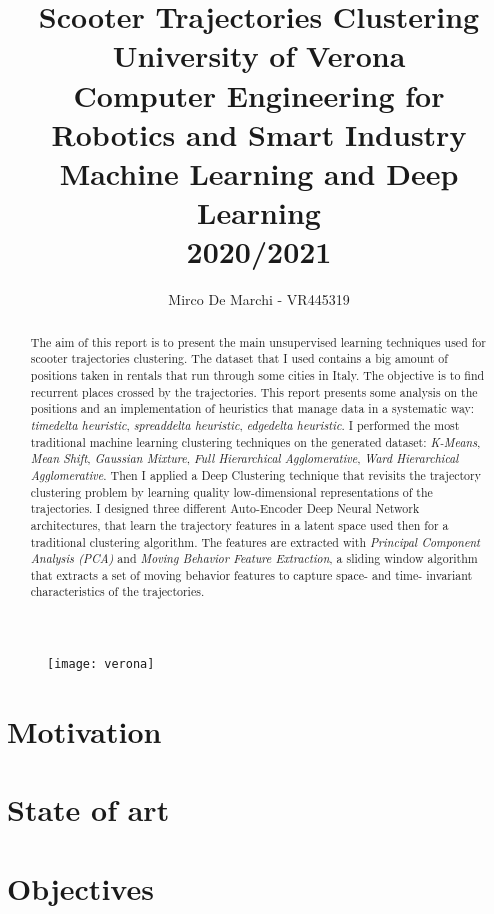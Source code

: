 \documentclass[]{IEEEtran}
\title{Scooter Trajectories Clustering\\
	{\large University of Verona\\Computer Engineering for Robotics and Smart Industry\\Machine Learning and Deep Learning\\2020/2021\\}}
\author{Mirco De Marchi - VR445319}
\begin{document}
\maketitle

\begin{abstract}
	The aim of this report is to present the main unsupervised learning techniques used for scooter trajectories clustering. The dataset that I used contains a big amount of positions taken in rentals that run through some cities in Italy. The objective is to find recurrent places crossed by the trajectories. This report presents some analysis on the positions and an implementation of heuristics that manage data in a systematic way: \textit{timedelta heuristic}, \textit{spreaddelta heuristic}, \textit{edgedelta heuristic}. I performed the most traditional machine learning clustering techniques on the generated dataset: \textit{K-Means}, \textit{Mean Shift}, \textit{Gaussian Mixture}, \textit{Full Hierarchical Agglomerative}, \textit{Ward Hierarchical Agglomerative}. Then I applied a Deep Clustering technique that revisits the trajectory clustering problem by learning quality low-dimensional representations of the trajectories. I designed three different Auto-Encoder Deep Neural Network architectures, that learn the trajectory features in a latent space used then for a traditional clustering algorithm. The features are extracted with \textit{Principal Component Analysis (PCA)} and \textit{Moving Behavior Feature Extraction}, a sliding window algorithm that extracts a set of moving behavior features to capture space- and time- invariant characteristics of the trajectories.
\end{abstract}

\begin{figure}[hbt]
	\centering
	\texttt{[image: verona]}
	\label{fig:verona}
\end{figure}

\section{Motivation}


\section{State of art}


\section{Objectives}

\end{document}
